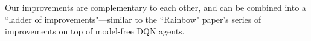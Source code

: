 Our improvements are complementary to each other, and  can be combined into a  ``ladder of improvements"---similar to the ``Rainbow" paper's
\citep{Hessel2018} series of improvements on top of model-free DQN agents. 





